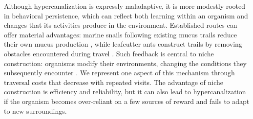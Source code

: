 \documentclass[12pt,fleqn]{article}
\begin{document}
%
%

Although hypercanalization is expressly maladaptive, it is more modestly rooted in  behavioral persistence, which can reflect both learning within an organism and changes that its activities produce in the environment. Established routes can offer material advantages: marine snails following existing mucus trails reduce their own mucus production \cite{davies_energy_2007}, while leafcutter ants construct trails by removing obstacles encountered during travel \cite{bochynek_infrastructure_2019}. Such feedback is central to niche construction: organisms modify their environments, changing the conditions they subsequently encounter \cite{laland_niche_2016}. We represent one aspect of this mechanism through traversal costs that decrease with repeated visits. The advantage of niche construction is efficiency and reliability, but it can also lead to hypercanalization if the organism becomes over-reliant on a few sources of reward and fails to adapt to new surroundings.
\end{document}
